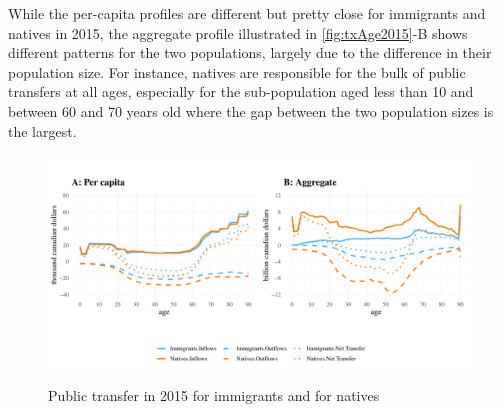 \vspace{0.7em}\par
While the per-capita profiles are different but pretty close for immigrants and natives in 2015, the aggregate profile illustrated in \autoref{fig:txAge2015}-B shows different patterns for the two populations, largely due to the difference in their population size.
For instance, natives are responsible for the bulk of public transfers at all ages, especially for the sub-population aged less than 10 and between 60 and 70 years old where the gap between the two population sizes is the largest.

\begin{figure}[H]%
  \caption{Public transfer in 2015 for immigrants and for natives}
  \includegraphics[width=1\textwidth]{res/txAge2015.pdf}%
  \label{fig:txAge2015}%
\end{figure}%